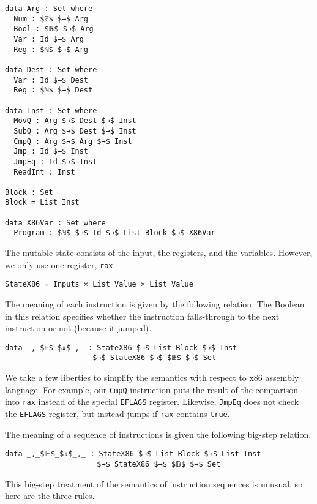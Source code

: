 \documentclass[sigplan,review,dvipsnames,screen,10pt]{acmart}
\begin{document}
\begin{lstlisting}
data Arg : Set where
  Num : $ℤ$ $→$ Arg
  Bool : $𝔹$ $→$ Arg
  Var : Id $→$ Arg
  Reg : $ℕ$ $→$ Arg

data Dest : Set where
  Var : Id $→$ Dest
  Reg : $ℕ$ $→$ Dest

data Inst : Set where
  MovQ : Arg $→$ Dest $→$ Inst
  SubQ : Arg $→$ Dest $→$ Inst
  CmpQ : Arg $→$ Arg $→$ Inst
  Jmp : Id $→$ Inst
  JmpEq : Id $→$ Inst
  ReadInt : Inst

Block : Set
Block = List Inst

data X86Var : Set where
  Program : $ℕ$ $→$ Id $→$ List Block $→$ X86Var
\end{lstlisting}

The mutable state consists of the input, the registers, and the
variables. However, we only use one register, \lstinline{rax}.

\begin{lstlisting}
StateX86 = Inputs × List Value × List Value
\end{lstlisting}

The meaning of each instruction is given by the following relation.
The Boolean in this relation specifies whether the instruction
falls-through to the next instruction or not (because it jumped).

\begin{lstlisting}
data _,_$⊢$_$⇓$_,_ : StateX86 $→$ List Block $→$ Inst
                    $→$ StateX86 $→$ $𝔹$ $→$ Set
\end{lstlisting}

\noindent We take a few liberties to simplify the semantics with
respect to x86 assembly language. For example, our \lstinline{CmpQ}
instruction puts the result of the comparison into \lstinline{rax}
instead of the special \lstinline{EFLAGS} register. Likewise,
\lstinline{JmpEq} does not check the \lstinline{EFLAGS} register, but
instead jumps if \lstinline{rax} contains \lstinline{true}.

\noindent The meaning of a sequence of instructions is given the
following big-step relation.

\begin{lstlisting}
data _,_$⊩$_$⇓$_,_ : StateX86 $→$ List Block $→$ List Inst
                     $→$ StateX86 $→$ $𝔹$ $→$ Set 
\end{lstlisting}

This big-step treatment of the semantics of instruction sequences is
unusual, so here are the three rules.
\end{document}
